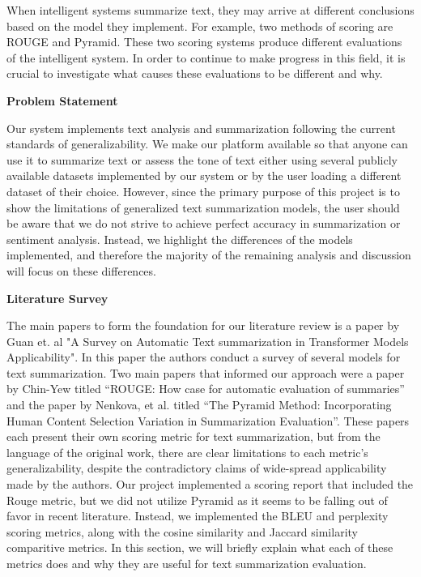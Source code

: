 \vspace{5pt}

When intelligent systems summarize text, they may arrive at different conclusions based on the model they implement.
For example, two methods of scoring are ROUGE\cite{Rouge} and Pyramid\cite{Pyramid}.
These two scoring systems produce different evaluations of the intelligent system.
In order to continue to make progress in this field, it is crucial to investigate what causes these evaluations to be different and why.


\vspace{5pt}

\begin{large}
    \noindent\textbf{Problem Statement}
\end{large}

Our system implements text analysis and summarization following the current standards of generalizability.
We make our platform available so that anyone can use it to summarize text or assess the tone of text either using several publicly available datasets implemented by our system or by the user loading a different dataset of their choice.
However, since the primary purpose of this project is to show the limitations of generalized text summarization models, the user should be aware that we do not strive to achieve perfect accuracy in summarization or sentiment analysis.
Instead, we highlight the differences of the models implemented, and therefore the majority of the remaining analysis and discussion will focus on these differences. 

\vspace{5pt}

\begin{large}
    \noindent\textbf{Literature Survey}
\end{large}

The main papers to form the foundation for our literature review is a paper by Guan et. al "A Survey on Automatic Text summarization in Transformer Models Applicability"\cite{Transformers}.
In this paper the authors conduct a survey of several models for text summarization.
Two main papers that informed our approach were a paper by Chin-Yew titled “ROUGE: How case for automatic evaluation of summaries”\cite{Rouge} and the paper by Nenkova, et al. titled “The Pyramid Method: Incorporating Human Content Selection Variation in Summarization Evaluation”\cite{Pyramid}.
These papers each present their own scoring metric for text summarization, but from the language of the original work, there are clear limitations to each metric's generalizability, despite the contradictory claims of wide-spread applicability made by the authors.
Our project implemented a scoring report that included the Rouge metric, but we did not utilize Pyramid as it seems to be falling out of favor in recent literature.
Instead, we implemented the BLEU and perplexity scoring metrics, along with the cosine similarity and Jaccard similarity comparitive metrics.
In this section, we will briefly explain what each of these metrics does and why they are useful for text summarization evaluation.

